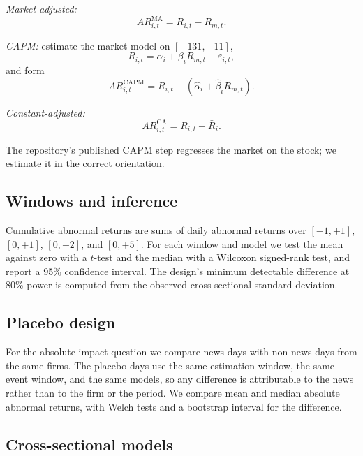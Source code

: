 \documentclass[10pt,twocolumn,a4paper]{article}
\begin{document}
\emph{Market-adjusted:}
\begin{equation}
AR^{\mathrm{MA}}_{i,t} = R_{i,t} - R_{m,t}.
\label{eq:ma}
\end{equation}

\emph{CAPM:} estimate the market model on $[-131,-11]$,
\begin{equation}
R_{i,t} = \alpha_i + \beta_i R_{m,t} + \varepsilon_{i,t},
\label{eq:capm}
\end{equation}
and form
\begin{equation}
AR^{\mathrm{CAPM}}_{i,t} = R_{i,t} - \left(\hat{\alpha}_i + \hat{\beta}_i R_{m,t}\right).
\label{eq:capm-ar}
\end{equation}

\emph{Constant-adjusted:}
\begin{equation}
AR^{\mathrm{CA}}_{i,t} = R_{i,t} - \bar{R}_i.
\label{eq:ca}
\end{equation}

The repository's published CAPM step regresses the market on the stock; we estimate it in the correct
orientation.

\subsection{Windows and inference}

Cumulative abnormal returns are sums of daily abnormal returns over $[-1,+1]$, $[0,+1]$, $[0,+2]$, and
$[0,+5]$. For each window and model we test the mean against zero with a $t$-test and the median with a
Wilcoxon signed-rank test, and report a 95\% confidence interval. The design's minimum detectable
difference at 80\% power is computed from the observed cross-sectional standard deviation.

\subsection{Placebo design}

For the absolute-impact question we compare news days with non-news days from the same firms. The
placebo days use the same estimation window, the same event window, and the same models, so any
difference is attributable to the news rather than to the firm or the period. We compare mean and
median absolute abnormal returns, with Welch tests and a bootstrap interval for the difference.

\subsection{Cross-sectional models}
\end{document}
